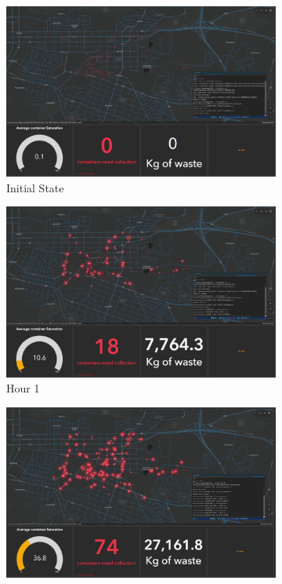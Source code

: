 \documentclass[authoryear,preprint,review,11pt,doubleblind]{elsarticle}
\begin{document}
    \begin{figure}[h!]
        \centering
        \begin{subfigure}[b]{0.45\linewidth}
        \includegraphics[width=\linewidth]{Figures/Sim1.png} 
        \caption{Initial State}
    \end{subfigure}
    \begin{subfigure}[b]{0.45\linewidth}
        \includegraphics[width=\linewidth]{Figures/Sim2.png}
        \caption{Hour 1}
    \end{subfigure}
    \begin{subfigure}[b]{0.45\linewidth}
        \includegraphics[width=\linewidth]{Figures/Sim3.png}

\end{subfigure}
\end{figure}
\end{document}
